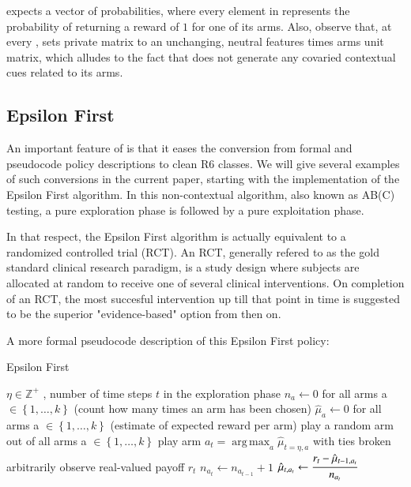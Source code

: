 \documentclass{jss}\usepackage[]{graphicx}\usepackage[]{color}
\DeclareMathOperator*{\argmax}{arg\,max}
\begin{document}
 expects a  vector of probabilities, where every element in  represents the probability of  returning a reward of $1$ for one of its  arms. Also, observe that, at every ,  sets private  matrix  to an unchanging, neutral  features times  arms unit matrix, which alludes to the fact that  does not generate any covaried contextual cues related to its arms.

\subsection{Epsilon First}

An important feature of  is that it eases the conversion from formal and pseudocode policy descriptions to clean R6 classes. We will give several examples of such conversions in the current paper, starting with the implementation of the Epsilon First algorithm. In this non-contextual algorithm, also known as AB(C) testing, a pure exploration phase is followed by a pure exploitation phase.

In that respect, the Epsilon First algorithm is actually equivalent to a randomized controlled trial (RCT). An RCT, generally refered to as the gold standard clinical research paradigm, is a study design where subjects are allocated at random to receive one of several clinical interventions. On completion of an RCT, the most succesful intervention up till that point in time is suggested to be the superior "evidence-based" option from then on.

A more formal pseudocode description of this Epsilon First policy:

\begin{algorithm}[H]
\caption{Epsilon First}
\label{Alg:EpsilonFirst}
\begin{algorithmic}
\REQUIRE \(   \eta \in \mathbb{Z}^{+} \)  , number of time steps $t$ in the exploration phase
\STATE \( n_{a} \leftarrow 0 \) for all arms a \(  \in \left\{ 1, \dots, k \right\} \)  (count how many times an arm has been chosen)
\STATE \( \hat{\mu}_{a} \leftarrow 0 \) for all arms a  \(   \in \left\{ 1, \dots, k \right\} \)  (estimate of expected reward per arm)
	       \STATE play a random arm out of all arms a \(   \in \left\{ 1, \dots, k \right\} \)
	\ELSE
	        \STATE play arm \(a_t = \argmax_a  \hat{\mu}_{t=\eta,a}  \) with ties broken arbitrarily
	\ENDIF
	\STATE observe real-valued payoff $r_t$
	\STATE \( n_{a_{t}} \leftarrow n_{a_{t-1}} + 1  \)
   \STATE \( \hat{\mu}_{t,a_{t}} \leftarrow   \cfrac{r_t - \hat{\mu}_{t-1,a_{t}} }{n_{a_{t}}}   \)
\ENDFOR
\end{algorithmic}
\end{algorithm}
\end{document}
